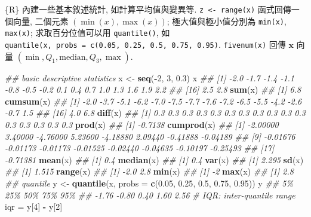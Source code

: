 \documentclass[
]{book}
\newenvironment{Shaded}{\begin{snugshade}}{\end{snugshade}}
\newcommand{\CommentTok}[1]{\textcolor[rgb]{0.56,0.35,0.01}{\textit{#1}}}
\newcommand{\DataTypeTok}[1]{\textcolor[rgb]{0.13,0.29,0.53}{#1}}
\newcommand{\DecValTok}[1]{\textcolor[rgb]{0.00,0.00,0.81}{#1}}
\newcommand{\FloatTok}[1]{\textcolor[rgb]{0.00,0.00,0.81}{#1}}
\newcommand{\KeywordTok}[1]{\textcolor[rgb]{0.13,0.29,0.53}{\textbf{#1}}}
\newcommand{\NormalTok}[1]{#1}
\newcommand{\OperatorTok}[1]{\textcolor[rgb]{0.81,0.36,0.00}{\textbf{#1}}}
\newcommand{\StringTok}[1]{\textcolor[rgb]{0.31,0.60,0.02}{#1}}
\begin{document}
\{R\} 內建一些基本敘述統計, 如計算平均值與變異等.
\texttt{z\ \textless{}-\ range(x)} 函式回傳一個向量,
二個元素 \((\min(x), \max(x))\);
極大值與極小值分別為 \texttt{min(x)}, \texttt{max(x)};
求取百分位值可以用 \texttt{quantile()},
如 \texttt{quantile(x,\ probs\ =\ c(0.05,\ 0.25,\ 0.5,\ 0.75,\ 0.95)}.
\texttt{fivenum(x)} 回傳 \(\mathbf{x}\) 向量 \((\min, Q_1, \text{median}, Q_3, \max)\).

\begin{Shaded}
\begin{Highlighting}[]
\CommentTok{\#\# basic descriptive statistics}
\NormalTok{x \textless{}{-}}\StringTok{ }\KeywordTok{seq}\NormalTok{(}\OperatorTok{{-}}\DecValTok{2}\NormalTok{, }\DecValTok{3}\NormalTok{, }\FloatTok{0.3}\NormalTok{)}
\NormalTok{x}
\CommentTok{\#\#  [1] {-}2.0 {-}1.7 {-}1.4 {-}1.1 {-}0.8 {-}0.5 {-}0.2  0.1  0.4  0.7  1.0  1.3  1.6  1.9  2.2}
\CommentTok{\#\# [16]  2.5  2.8}
\KeywordTok{sum}\NormalTok{(x)}
\CommentTok{\#\# [1] 6.8}
\KeywordTok{cumsum}\NormalTok{(x)}
\CommentTok{\#\#  [1] {-}2.0 {-}3.7 {-}5.1 {-}6.2 {-}7.0 {-}7.5 {-}7.7 {-}7.6 {-}7.2 {-}6.5 {-}5.5 {-}4.2 {-}2.6 {-}0.7  1.5}
\CommentTok{\#\# [16]  4.0  6.8}
\KeywordTok{diff}\NormalTok{(x)}
\CommentTok{\#\#  [1] 0.3 0.3 0.3 0.3 0.3 0.3 0.3 0.3 0.3 0.3 0.3 0.3 0.3 0.3 0.3 0.3}
\KeywordTok{prod}\NormalTok{(x)}
\CommentTok{\#\# [1] {-}0.7138}
\KeywordTok{cumprod}\NormalTok{(x)}
\CommentTok{\#\#  [1] {-}2.00000  3.40000 {-}4.76000  5.23600 {-}4.18880  2.09440 {-}0.41888 {-}0.04189}
\CommentTok{\#\#  [9] {-}0.01676 {-}0.01173 {-}0.01173 {-}0.01525 {-}0.02440 {-}0.04635 {-}0.10197 {-}0.25493}
\CommentTok{\#\# [17] {-}0.71381}
\KeywordTok{mean}\NormalTok{(x)}
\CommentTok{\#\# [1] 0.4}
\KeywordTok{median}\NormalTok{(x)}
\CommentTok{\#\# [1] 0.4}
\KeywordTok{var}\NormalTok{(x)}
\CommentTok{\#\# [1] 2.295}
\KeywordTok{sd}\NormalTok{(x)}
\CommentTok{\#\# [1] 1.515}
\KeywordTok{range}\NormalTok{(x)}
\CommentTok{\#\# [1] {-}2.0  2.8}
\KeywordTok{min}\NormalTok{(x)}
\CommentTok{\#\# [1] {-}2}
\KeywordTok{max}\NormalTok{(x)}
\CommentTok{\#\# [1] 2.8}
\CommentTok{\#\# quantile}
\NormalTok{y \textless{}{-}}\StringTok{ }\KeywordTok{quantile}\NormalTok{(x, }\DataTypeTok{probs =} \KeywordTok{c}\NormalTok{(}\FloatTok{0.05}\NormalTok{, }\FloatTok{0.25}\NormalTok{, }\FloatTok{0.5}\NormalTok{, }\FloatTok{0.75}\NormalTok{, }\FloatTok{0.95}\NormalTok{))}
\NormalTok{y}
\CommentTok{\#\#    5\%   25\%   50\%   75\%   95\% }
\CommentTok{\#\# {-}1.76 {-}0.80  0.40  1.60  2.56}
\CommentTok{\# IQR: inter{-}quantile range}
\NormalTok{iqr =}\StringTok{ }\NormalTok{y[}\DecValTok{4}\NormalTok{] }\OperatorTok{{-}}\StringTok{ }\NormalTok{y[}\DecValTok{2}\NormalTok{]}

\end{Highlighting}
\end{Shaded}
\end{document}
